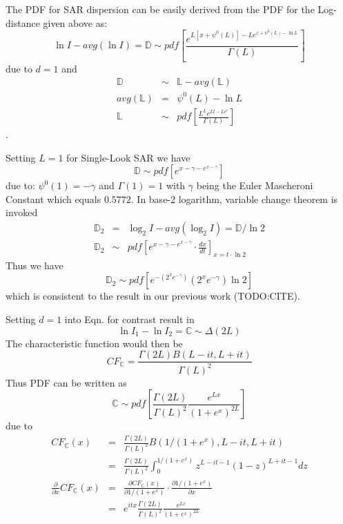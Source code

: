 \documentclass[journal]{IEEEtran}
\begin{document}
The PDF for SAR dispersion can be easily derived from
  the PDF for the Log-distance given above as:
  \begin{equation}
   \ln{I} - avg(\ln{I}) =  \mathbb{D} \sim pdf \left[ \frac{e^{L[x+\psi^0(L)]-Le^{x+\psi^0(L)-\ln{L}}}}{\Gamma(L)} \right]
  \end{equation}
due to $d=1$ and
\begin{eqnarray*}
  \mathbb{D} &\sim& \mathbb{L} - avg(\mathbb{L}) \\
  avg(\mathbb{L}) &=& \psi^0(L) - \ln{L} \\
  \mathbb{L} &\sim& pdf \left[ \frac{L^Le^{Lt-Le^t}}{ \Gamma(L)}  \right]
\end{eqnarray*}.

Setting $L=1$ for Single-Look SAR we have
\begin{equation}
  \mathbb{D} \sim pdf \left[ e^{x-\gamma-e^{x-\gamma}} \right]
\end{equation}
due to: $\psi^0(1)=-\gamma$ and $\Gamma(1)=1$
with $\gamma$ being the Euler Mascheroni Constant which equals $0.5772$. 
In base-2 logarithm, variable change theorem is invoked
\begin{eqnarray*}
  \mathbb{D}_2 &=& \log_2{I} - avg(\log_2{I}) = \mathbb{D}/\ln{2} \\
  \mathbb{D}_2 &\sim& pdf \left[ e^{x-\gamma-e^{x-\gamma}} \cdot \frac{dx}{dt} \right]_{x=t \cdot \ln2}
\end{eqnarray*}
Thus we have
\begin{equation}
  \mathbb{D}_2 \sim pdf \left[ e^{-(2^xe^{-\gamma})} (2^xe^{-\gamma}) \ln2 \right]
\end{equation}
which is consistent to the result in our previous work (TODO:CITE).

Setting $d=1$ into Eqn. for contrast result in
\begin{equation}
  \ln{I_1} - \ln{I_2} = \mathbb{C} \sim \Delta(2L)
\end{equation}
The characteristic function would then be
\begin{equation}
  CF_\mathbb{C} =  \frac{\Gamma(2L) B(L-it,L+it)}{\Gamma(L)^2} 
\end{equation}
Thus PDF can be written as
\begin{equation}
  \mathbb{C} \sim pdf \left[ \frac{\Gamma(2L) }{\Gamma(L)^2} \frac{e^{Lx}}{(1+e^x)^{2L}} \right] \label{eqn:multi_look_SAR_contrast_pdf}
\end{equation}
due to
\begin{eqnarray*}
  CF_{\mathbb{C}}(x) &=& \frac{\Gamma(2L) }{\Gamma(L)^2} B(1/(1+e^x),L-it,L+it)  \\
       &=& \frac{\Gamma(2L) }{\Gamma(L)^2} \int^{1/(1+e^x)}_0 z^{L-it-1}(1-z)^{L+it-1} dz \\
  \frac{\partial }{\partial x} CF_{\mathbb{C}}(x) &=&  \frac{\partial CF_{\mathbb{C}}(x) }{\partial 1/(1+e^x)} \cdot \frac{\partial 1/(1+e^x)}{\partial x} \\
        &=&  e^{itx} \frac{\Gamma(2L) }{\Gamma(L)^2} \frac{e^{Lx}}{(1+e^x)^{2L}}   
\end{eqnarray*}
\end{document}
